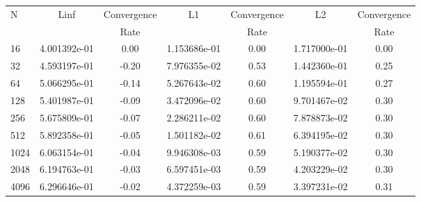 \documentclass[12pt]{article}
\begin{document}
	\begin{tabular}{l|c|c|c|c|c|c}
		N&Linf&Convergence&L1&Convergence&L2&Convergence\\
		&&Rate&&Rate&&Rate\\
		\hline
		16&4.001392e-01&0.00&1.153686e-01&0.00&1.717000e-01&0.00\\
		\hline
		32&4.593197e-01&-0.20&7.976355e-02&0.53&1.442360e-01&0.25\\
		\hline
		64&5.066295e-01&-0.14&5.267643e-02&0.60&1.195594e-01&0.27\\
		\hline
		128&5.401987e-01&-0.09&3.472096e-02&0.60&9.701467e-02&0.30\\
		\hline
		256&5.675809e-01&-0.07&2.286211e-02&0.60&7.878873e-02&0.30\\
		\hline
		512&5.892358e-01&-0.05&1.501182e-02&0.61&6.394195e-02&0.30\\
		\hline
		1024&6.063154e-01&-0.04&9.946308e-03&0.59&5.190377e-02&0.30\\
		\hline
		2048&6.194763e-01&-0.03&6.597451e-03&0.59&4.203229e-02&0.30\\
		\hline
		4096&6.296646e-01&-0.02&4.372259e-03&0.59&3.397231e-02&0.31\\
	\end{tabular}
\end{document}
